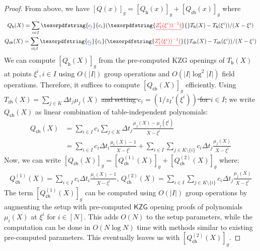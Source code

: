 \documentclass[sigconf]{acmart}
\newcommand{\setind}{I}
\newcommand{\Tbasepoly}[1]{T_{\mathsf{b}}({#1})}
\newcommand{\Tcachepoly}[1]{T_{\mathsf{ch}}({#1})}
\newcommand{\Qbasepoly}[1]{Q_{\mathsf{b}}({#1})}
\newcommand{\Qcachepoly}[1]{Q_{\mathsf{ch}}({#1})}
\newcommand{\Qcachepolyone}[1]{Q^{(1)}_{\mathsf{ch}}({#1})} %
\newcommand{\Qcachepolytwo}[1]{Q^{(2)}_{\mathsf{ch}}({#1})} %
\newcommand{\gany}[1]{\ensuremath{\left[{#1}\right]_g}}
\newcommand{\kzg}{\ensuremath{\mathsf{KZG}}}
\newcommand{\elttwo}[1]{[#1]_2}
\newcommand{\elany}[1]{[#1]_g}
\providecommand{\DIFaddtex}[1]{{\protect\color{blue}\uwave{#1}}} %
\providecommand{\DIFdeltex}[1]{{\protect\color{red}\sout{#1}}}                      %
\providecommand{\DIFaddbegin}{} %
\providecommand{\DIFaddend}{} %
\providecommand{\DIFdelbegin}{} %
\providecommand{\DIFdelend}{} %
\providecommand{\DIFadd}[1]{\texorpdfstring{\DIFaddtex{#1}}{#1}} %
\providecommand{\DIFdel}[1]{\texorpdfstring{\DIFdeltex{#1}}{}} %
\newcommand{\DIFscaledelfig}{0.5}
\newlength{\DIFdelgraphicswidth} %
\newlength{\DIFdelgraphicsheight} %
\newcommand{\DIFaddincludegraphics}[2][]{{\color{blue}\fbox{\DIFOincludegraphics[#1]{#2}}}} %
\newcommand{\DIFdelincludegraphics}[2][]{%
	\sbox{\DIFdelgraphicsbox}{\DIFOincludegraphics[#1]{#2}}%
	\settoboxwidth{\DIFdelgraphicswidth}{\DIFdelgraphicsbox} %
	\settoboxtotalheight{\DIFdelgraphicsheight}{\DIFdelgraphicsbox} %
	\scalebox{\DIFscaledelfig}{%
		\parbox[b]{\DIFdelgraphicswidth}{\usebox{\DIFdelgraphicsbox}\\[-\baselineskip] \rule{\DIFdelgraphicswidth}{0em}}\llap{\resizebox{\DIFdelgraphicswidth}{\DIFdelgraphicsheight}{%
				\setlength{\unitlength}{\DIFdelgraphicswidth}%
				\begin{picture}(1,1)%
					\thicklines\linethickness{2pt} %
					{\color[rgb]{1,0,0}\put(0,0){\framebox(1,1){}}}%
					{\color[rgb]{1,0,0}\put(0,0){\line( 1,1){1}}}%
					{\color[rgb]{1,0,0}\put(0,1){\line(1,-1){1}}}%
				\end{picture}%
			}\hspace*{3pt}}} %
} %
\DeclareRobustCommand{\DIFaddbegin}{\DIFOaddbegin \let\includegraphics\DIFaddincludegraphics} %
\DeclareRobustCommand{\DIFaddend}{\DIFOaddend \let\includegraphics\DIFOincludegraphics} %
\DeclareRobustCommand{\DIFdelbegin}{\DIFOdelbegin \let\includegraphics\DIFdelincludegraphics} %
\DeclareRobustCommand{\DIFdelend}{\DIFOaddend \let\includegraphics\DIFOincludegraphics} %
\begin{document}
\begin{proof}
		\DIFdelend From above, we have $\gany{Q(x)}=\gany{\Qbasepoly{x}}+\gany{\Qcachepoly{x}}$ where
		\begin{gather*}
			\Qbasepoly{X}=\sum_{i\in \setind}\DIFaddbegin \DIFadd{c_i }\DIFaddend (\DIFdelbegin \DIFdel{Z_I'(\xi^i))^{-1} (}\DIFdelend \Tbasepoly{X}-\Tbasepoly{\xi^i})/(X-\xi^i) \\
			\Qcachepoly{X}=\sum_{i\in \setind}\DIFaddbegin \DIFadd{c_i}\DIFaddend (\DIFdelbegin \DIFdel{Z_I'(\xi^i))^{-1} (}\DIFdelend \Tcachepoly{X}-\Tcachepoly{\xi^i})/(X-\xi^i)
		\end{gather*}
		We can compute
		$\gany{\Qbasepoly{X}}$ from the pre-computed KZG openings of $\Tbasepoly{X}$ at points $\xi^i,i\in I$ using $O(|I|)$ group operations and
		$O(|I|\log^2 |I|)$ field operations. Therefore, it suffices to compute $\gany{\Qcachepoly{X}}$ efficiently.
		Using $\Tcachepoly{X}=\sum_{j\in K}\Delta t_j\mu_j(X)$
		\DIFdelbegin \DIFdel{and setting $c_i=(1/z_I'(\xi^i))$ for $i\in I$,
		}\DIFdelend we write $\Qcachepoly{X}$ as linear combination of table-independent polynomials:
		\begin{align*}
			\Qcachepoly{X} &= \sum_{i\in \setind} c_i\sum_{j\in K} \Delta t_j\frac{\mu_j(X)-\mu_j(\xi^i)}{X-\xi^i} \\
			&= \sum_{i\in \setind} c_i\Delta t_i\frac{\mu_i(X) - 1}{X-\xi^i} + \sum_{i\in \setind}\sum_{j\in K\setminus\{i\}}c_i\Delta t_j\frac{\mu_j(X)}{X-\xi^i}
		\end{align*}
		Now, we can write $\gany{\Qcachepoly{X}}=\elany{\Qcachepolyone{X}} + \elany{\Qcachepolytwo{X}}$ where:
		{
			\DIFdelbegin %
			\DIFdelend \begin{gather*}
				\Qcachepolyone{X}=\sum_{i\in \setind}c_i\Delta t_i\frac{\mu_i(X)-1}{X-\xi^i},\,
				\Qcachepolytwo{X}=\sum_{i\in \setind}\sum_{j\in K\setminus \{i\}} c_i\Delta t_j\frac{\mu_j(X)}{X-\xi^i}
			\end{gather*}
		}
		The term $\gany{\Qcachepolyone{X}}$ can be computed using $O(|I|)$ group operations by augmenting the setup with pre-computed
		$\kzg$ opening proofs of polynomials $\mu_i(X)$ at $\xi^i$ for $i\in [N]$. This adds $O(N)$ to the setup parameters, while the computation
		can be done in $O(N\log N)$ time with methods similar to existing pre-computed parameters. This eventually leaves us with $\elany{\Qcachepolytwo{X}}$.

\end{proof}
\end{document}
